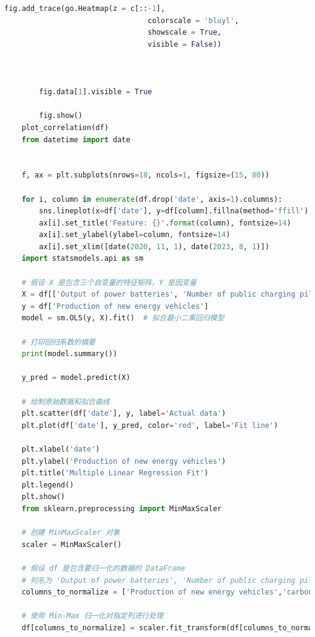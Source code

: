 \documentclass{apmcmthesis}
\begin{document}
\begin{lstlisting}[language=Python,caption={The Python Source code of Algorithm}]
        fig.add_trace(go.Heatmap(z = c[::-1],
                                 colorscale = 'bluyl',
                                 showscale = True,
                                 visible = False))
        
        
        
        fig.data[1].visible = True
    
        fig.show()
    plot_correlation(df)
    from datetime import date
    
    
    f, ax = plt.subplots(nrows=18, ncols=1, figsize=(15, 80))
    
    for i, column in enumerate(df.drop('date', axis=1).columns):
        sns.lineplot(x=df['date'], y=df[column].fillna(method='ffill'), ax=ax[i], color='dodgerblue')
        ax[i].set_title('Feature: {}'.format(column), fontsize=14)
        ax[i].set_ylabel(ylabel=column, fontsize=14)
        ax[i].set_xlim([date(2020, 11, 1), date(2023, 8, 1)])  
    import statsmodels.api as sm
    
    # 假设 X 是包含三个自变量的特征矩阵，Y 是因变量
    X = df[['Output of power batteries', 'Number of public charging piles_DC piles', 'Subsidy policy','International energy market prices', 'BeijingAQI']]
    y = df['Production of new energy vehicles']
    model = sm.OLS(y, X).fit()  # 拟合最小二乘回归模型
    
    # 打印回归系数的摘要
    print(model.summary())
    
    y_pred = model.predict(X)
    
    # 绘制原始数据和拟合曲线
    plt.scatter(df['date'], y, label='Actual data')
    plt.plot(df['date'], y_pred, color='red', label='Fit line')
    
    plt.xlabel('date')
    plt.ylabel('Production of new energy vehicles')
    plt.title('Multiple Linear Regression Fit')
    plt.legend()
    plt.show()
    from sklearn.preprocessing import MinMaxScaler
    
    # 创建 MinMaxScaler 对象
    scaler = MinMaxScaler()
    
    # 假设 df 是包含要归一化的数据的 DataFrame
    # 列名为 'Output of power batteries', 'Number of public charging piles_DC piles', 'Subsidy policy', 'International energy market prices', 'BeijingAQI'
    columns_to_normalize = ['Production of new energy vehicles','carbon emission','BeijingAQI']
    
    # 使用 Min-Max 归一化对指定列进行处理
    df[columns_to_normalize] = scaler.fit_transform(df[columns_to_normalize])
    

\end{lstlisting}
\end{document}
